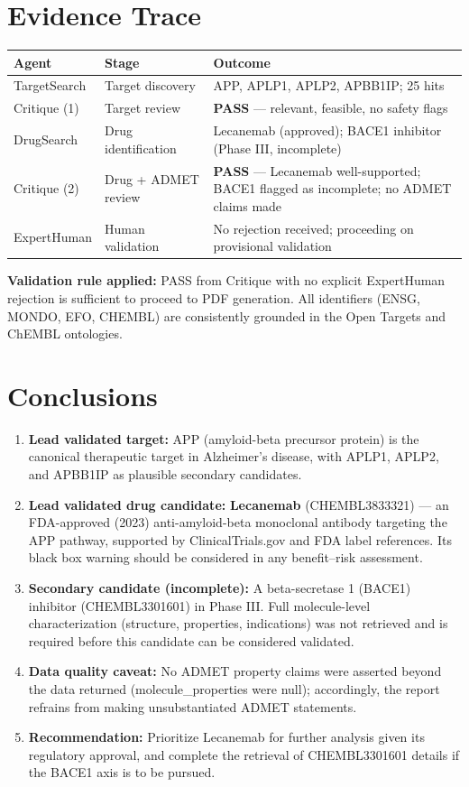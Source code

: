 \documentclass{article}
\begin{document}
\section{Evidence Trace}
\begin{table}[h]
\centering
\renewcommand{\arraystretch}{1.3}
\begin{tabular}{@{}p{3.2cm}p{4.2cm}p{6.2cm}@{}}
\toprule
\textbf{Agent} & \textbf{Stage} & \textbf{Outcome} \\
\midrule
TargetSearch & Target discovery & APP, APLP1, APLP2, APBB1IP; 25 hits \\
Critique (1) & Target review & \textbf{PASS} --- relevant, feasible, no safety flags \\
DrugSearch & Drug identification & Lecanemab (approved); BACE1 inhibitor (Phase III, incomplete) \\
Critique (2) & Drug + ADMET review & \textbf{PASS} --- Lecanemab well-supported; BACE1 flagged as incomplete; no ADMET claims made \\
ExpertHuman & Human validation & No rejection received; proceeding on provisional validation \\
\bottomrule
\end{tabular}
\end{table}

\noindent \textbf{Validation rule applied:} PASS from Critique with no explicit ExpertHuman rejection is sufficient to proceed to PDF generation. All identifiers (ENSG, MONDO, EFO, CHEMBL) are consistently grounded in the Open Targets and ChEMBL ontologies.

\section{Conclusions}
\begin{enumerate}
    \item \textbf{Lead validated target:} APP (amyloid-beta precursor protein) is the canonical therapeutic target in Alzheimer's disease, with APLP1, APLP2, and APBB1IP as plausible secondary candidates.
    \item \textbf{Lead validated drug candidate:} \textbf{Lecanemab} (CHEMBL3833321) --- an FDA-approved (2023) anti-amyloid-beta monoclonal antibody targeting the APP pathway, supported by ClinicalTrials.gov and FDA label references. Its black box warning should be considered in any benefit--risk assessment.
    \item \textbf{Secondary candidate (incomplete):} A beta-secretase 1 (BACE1) inhibitor (CHEMBL3301601) in Phase III. Full molecule-level characterization (structure, properties, indications) was not retrieved and is required before this candidate can be considered validated.
    \item \textbf{Data quality caveat:} No ADMET property claims were asserted beyond the data returned (molecule\_properties were null); accordingly, the report refrains from making unsubstantiated ADMET statements.
    \item \textbf{Recommendation:} Prioritize Lecanemab for further analysis given its regulatory approval, and complete the retrieval of CHEMBL3301601 details if the BACE1 axis is to be pursued.
\end{enumerate}
\end{document}

